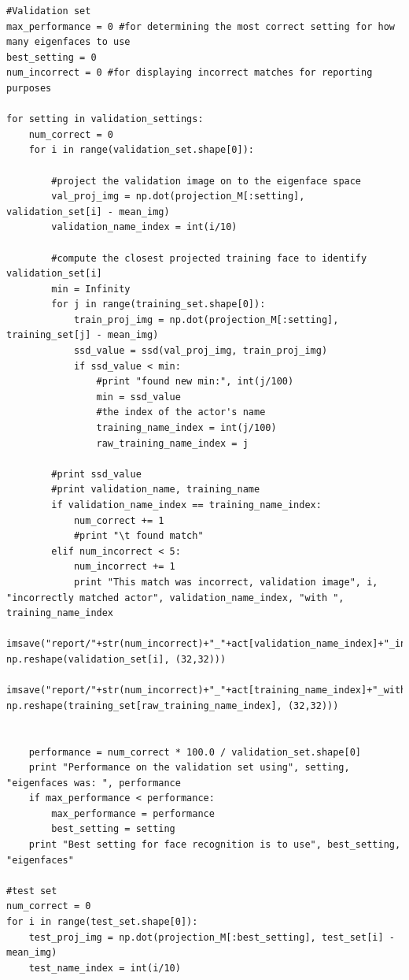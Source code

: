 \documentclass{article}
\begin{document}
\begin{lstlisting}
#Validation set
max_performance = 0 #for determining the most correct setting for how many eigenfaces to use
best_setting = 0
num_incorrect = 0 #for displaying incorrect matches for reporting purposes

for setting in validation_settings:
    num_correct = 0
    for i in range(validation_set.shape[0]):
        
        #project the validation image on to the eigenface space
        val_proj_img = np.dot(projection_M[:setting], validation_set[i] - mean_img)
        validation_name_index = int(i/10)
        
        #compute the closest projected training face to identify validation_set[i]
        min = Infinity
        for j in range(training_set.shape[0]):
            train_proj_img = np.dot(projection_M[:setting], training_set[j] - mean_img)
            ssd_value = ssd(val_proj_img, train_proj_img)
            if ssd_value < min:
                #print "found new min:", int(j/100)
                min = ssd_value
                #the index of the actor's name
                training_name_index = int(j/100)
                raw_training_name_index = j
                
        #print ssd_value
        #print validation_name, training_name
        if validation_name_index == training_name_index:
            num_correct += 1
            #print "\t found match"
        elif num_incorrect < 5:
            num_incorrect += 1
            print "This match was incorrect, validation image", i, "incorrectly matched actor", validation_name_index, "with ", training_name_index
            imsave("report/"+str(num_incorrect)+"_"+act[validation_name_index]+"_incorrectly_matched.jpg", np.reshape(validation_set[i], (32,32)))
            imsave("report/"+str(num_incorrect)+"_"+act[training_name_index]+"_with.jpg", np.reshape(training_set[raw_training_name_index], (32,32)))
            

    performance = num_correct * 100.0 / validation_set.shape[0]
    print "Performance on the validation set using", setting, "eigenfaces was: ", performance
    if max_performance < performance:
        max_performance = performance
        best_setting = setting
    print "Best setting for face recognition is to use", best_setting, "eigenfaces"
    
#test set
num_correct = 0
for i in range(test_set.shape[0]):
    test_proj_img = np.dot(projection_M[:best_setting], test_set[i] - mean_img)
    test_name_index = int(i/10)
    

\end{lstlisting}
\end{document}
